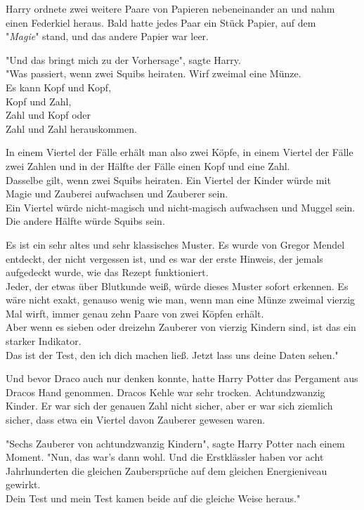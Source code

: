 {Harry ordnete zwei weitere Paare von Papieren nebeneinander an und nahm einen Federkiel heraus. Bald hatte jedes Paar ein Stück Papier, auf dem\\ "\emph{Magie}" stand, und das andere Papier war leer.

"Und das bringt mich zu der Vorhersage", sagte Harry.\\ "Was passiert, wenn zwei Squibs heiraten. Wirf zweimal eine Münze.\\ Es kann Kopf und Kopf,\\ Kopf und Zahl,\\ Zahl und Kopf oder\\ Zahl und Zahl herauskommen.

In einem Viertel der Fälle erhält man also zwei Köpfe, in einem Viertel der Fälle zwei Zahlen und in der Hälfte der Fälle einen Kopf und eine Zahl.\\ Dasselbe gilt, wenn zwei Squibs heiraten. Ein Viertel der Kinder würde mit Magie und Zauberei aufwachsen und Zauberer sein.\\ Ein Viertel würde nicht-magisch und nicht-magisch aufwachsen und Muggel sein. Die andere Hälfte würde Squibs sein.

Es ist ein sehr altes und sehr klassisches Muster. Es wurde von Gregor Mendel entdeckt, der nicht vergessen ist, und es war der erste Hinweis, der jemals aufgedeckt wurde, wie das Rezept funktioniert.\\ Jeder, der etwas über Blutkunde weiß, würde dieses Muster sofort erkennen. Es wäre nicht exakt, genauso wenig wie man, wenn man eine Münze zweimal vierzig Mal wirft, immer genau zehn Paare von zwei Köpfen erhält.\\ Aber wenn es sieben oder dreizehn Zauberer von vierzig Kindern sind, ist das ein starker Indikator.\\ Das ist der Test, den ich dich machen ließ. Jetzt lass uns deine Daten sehen."

Und bevor Draco auch nur denken konnte, hatte Harry Potter das Pergament aus Dracos Hand genommen. Dracos Kehle war sehr trocken. Achtundzwanzig Kinder. Er war sich der genauen Zahl nicht sicher, aber er war sich ziemlich sicher, dass etwa ein Viertel davon Zauberer gewesen waren.

"Sechs Zauberer von achtundzwanzig Kindern", sagte Harry Potter nach einem Moment. "Nun, das war's dann wohl. Und die Erstklässler haben vor acht Jahrhunderten die gleichen Zaubersprüche auf dem gleichen Energieniveau gewirkt.\\ Dein Test und mein Test kamen beide auf die gleiche Weise heraus."

}
